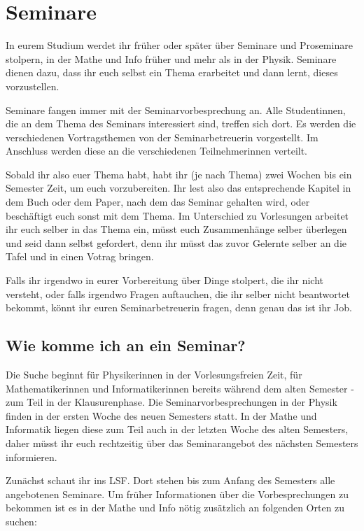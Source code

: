 \section{Seminare}

In eurem Studium werdet ihr früher oder später über Seminare und Proseminare stolpern, in der Mathe und Info früher und mehr als in der Physik. Seminare dienen dazu, dass ihr euch selbst ein Thema erarbeitet und dann lernt, dieses vorzustellen.

Seminare fangen immer mit der Seminarvorbesprechung an. Alle Studentinnen, die an dem Thema des Seminars interessiert sind, treffen sich dort. Es werden die verschiedenen Vortragsthemen von der Seminarbetreuerin vorgestellt. Im Anschluss werden diese an die verschiedenen Teilnehmerinnen verteilt.

Sobald ihr also euer Thema habt, habt ihr (je nach Thema) zwei Wochen bis ein Semester Zeit, um euch vorzubereiten. Ihr lest also das entsprechende Kapitel in dem Buch oder dem Paper, nach dem das Seminar gehalten wird, oder beschäftigt euch sonst mit dem Thema. Im Unterschied zu Vorlesungen arbeitet ihr euch selber in das Thema ein, müsst euch Zusammenhänge selber überlegen und seid dann selbst gefordert, denn ihr müsst das zuvor Gelernte selber an die Tafel und in einen Votrag bringen.

Falls ihr irgendwo in eurer Vorbereitung über Dinge stolpert, die ihr nicht versteht, oder falls irgendwo Fragen auftauchen, die ihr selber nicht beantwortet bekommt, könnt ihr euren Seminarbetreuerin fragen, denn genau das ist ihr Job.

\subsection{Wie komme ich an ein Seminar?}

Die Suche beginnt für Physikerinnen in der Vorlesungsfreien Zeit, für Mathematikerinnen und Informatikerinnen bereits während dem alten Semester \-- zum Teil in der Klausurenphase. Die Seminarvorbesprechungen in der Physik finden in der ersten Woche des neuen Semesters statt. In der Mathe und Informatik liegen diese zum Teil auch in der letzten Woche des alten Semesters, daher müsst ihr euch rechtzeitig über das Seminarangebot des nächsten Semesters informieren.

Zunächst schaut ihr ins LSF. Dort stehen bis zum Anfang des Semesters alle angebotenen Seminare. Um früher Informationen über die Vorbesprechungen zu bekommen ist es in der Mathe und Info nötig zusätzlich an folgenden Orten zu suchen:


